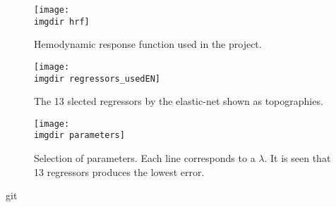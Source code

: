 \documentclass{article}
\newcommand{\imgdir}{Images/} %
\begin{document}
\begin{figure}[!ht]
    \centering
    \texttt{[image: \\imgdir hrf]}
    \caption{Hemodynamic response function used in the project.}
    \label{fig:hrf}
\end{figure}

\begin{figure}[!ht]
    \centering
    \texttt{[image: \\imgdir regressors\_usedEN]}
    \caption{The 13 slected regressors by the elastic-net shown as topographies.}
    \label{fig:regressors}
\end{figure}

\begin{figure}[!ht]
    \centering
    \texttt{[image: \\imgdir parameters]}
    \caption{Selection of parameters. Each line corresponds to a $\lambda$. It is seen that 13 regressors produces the lowest error.}
    \label{fig:parameters}
\end{figure}


\begin{table}[H]
\caption{Maximum Correlation of single microstate time course with DMN IC.}
\label{table:Robustness}
\centering
{}
\end{table}

\begin{table}[H]
\caption{Robustness.}
\label{table:Robustness}
\centering
{}
\end{table}git
\end{document}
